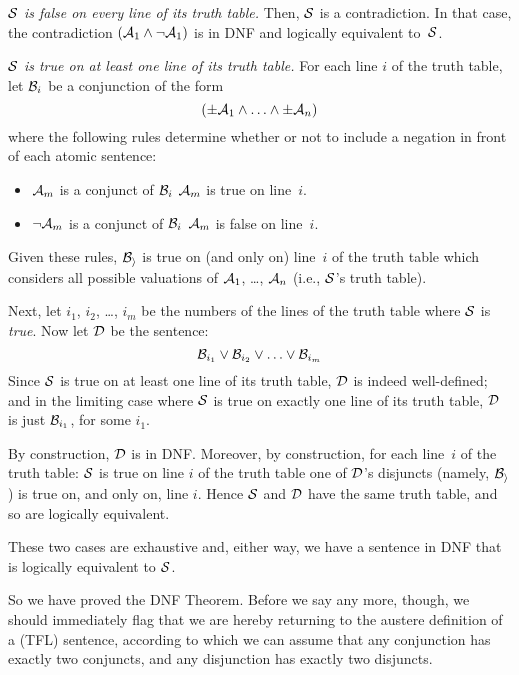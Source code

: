 	\begin{numberlist}
		\item \emph{$\mathcal{S}$ is false on every line of its truth table.} Then, $\mathcal{S}$ is a contradiction. In that case, the contradiction $(\mathcal{A}_1 \wedge \neg \mathcal{A}_1)$ is in DNF and logically equivalent to~$\mathcal{S}$.
	
		\item \emph{$\mathcal{S}$ is true on at least one line of its truth table.}
		For each line $i$ of the truth table, let $\mathcal{B}_i$ be a conjunction of the form 
		$$(\pm\mathcal{A}_1 \land \ldots \land \pm\mathcal{A}_n)$$
		where the following rules determine whether or not to include a negation in front of each atomic sentence:
			\begin{itemize}
				\item
				$\mathcal{A}_m$ is a conjunct of $\mathcal{B}_i$ \emph{\ifeff}
				$\mathcal{A}_m$ is true on line~$i$.
				\item $\neg\mathcal{A}_m$ is a conjunct of $\mathcal{B}_i$
				\emph{\ifeff} $\mathcal{A}_m$ is false on line~$i$.
			\end{itemize}
		Given these rules, $\mathcal{B_i}$ is true on (and only on) line~$i$ of the truth table which considers all possible valuations of $\mathcal{A}_1$, \ldots, $\mathcal{A}_n$ (i.e., $\mathcal{S}$'s truth table).
		
		Next, let $i_1$, $i_2$, \dots, $i_m$ be the numbers of the lines of the truth table where $\mathcal{S}$ is \emph{true}. Now let $\mathcal{D}$ be the sentence:
		$$\mathcal{B}_{i_1} \vee \mathcal{B}_{i_2} \vee \ldots \vee \mathcal{B}_{i_m}$$
		Since $\mathcal{S}$ is true on at least one line of its truth table, $\mathcal{D}$ is indeed well-defined; and in the limiting case where $\mathcal{S}$ is true on exactly one line of its truth table, $\mathcal{D}$ is just $\mathcal{B}_{i_1}$, for some $i_1$.
		
		By construction, $\mathcal{D}$ is in DNF. Moreover, by construction, for each line~$i$ of the truth table: $\mathcal{S}$ is true on line $i$ of the truth table \emph{\ifeff} one of $\mathcal{D}$'s disjuncts (namely, $\mathcal{B_i}$) is true on, and only on, line $i$. Hence $\mathcal{S}$ and $\mathcal{D}$ have the same truth table, and so are logically equivalent.
	\end{numberlist}
	These two cases are exhaustive and, either way, we have a sentence in DNF that is logically equivalent to $\mathcal{S}$.

So we have proved the DNF Theorem. Before we say any more, though, we should immediately flag that we are hereby returning to the austere definition of a (TFL) sentence, according to which we can assume that any conjunction has exactly two conjuncts, and any disjunction has exactly two disjuncts.



